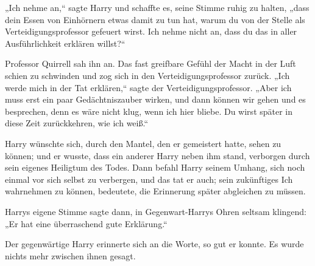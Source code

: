 „Ich nehme an,“ sagte Harry und schaffte es, seine Stimme ruhig zu halten, „dass dein Essen von Einhörnern etwas damit zu tun hat, warum du von der Stelle als Verteidigungsprofessor gefeuert wirst. Ich nehme nicht an, dass du das in aller Ausführlichkeit erklären willst?“

Professor Quirrell sah ihn an. Das fast greifbare Gefühl der Macht in der Luft schien zu schwinden und zog sich in den Verteidigungsprofessor zurück.
„Ich werde mich in der Tat erklären,“ sagte der Verteidigungsprofessor. „Aber ich muss erst ein paar Gedächtniszauber wirken, und dann können wir gehen und es besprechen, denn es wäre nicht klug, wenn ich hier bliebe. Du wirst später in diese Zeit zurückkehren, wie ich weiß.“

Harry wünschte sich, durch den Mantel, den er gemeistert hatte, sehen zu können; und er wusste, dass ein anderer Harry neben ihm stand, verborgen durch sein eigenes Heiligtum des Todes. Dann befahl Harry seinem Umhang, sich noch einmal vor sich selbst zu verbergen, und das tat er auch; sein zukünftiges Ich wahrnehmen zu können, bedeutete, die Erinnerung später abgleichen zu müssen.

Harrys eigene Stimme sagte dann, in Gegenwart-Harrys Ohren seltsam klingend: „Er hat eine überraschend gute Erklärung.“

Der gegenwärtige Harry erinnerte sich an die Worte, so gut er konnte. Es wurde nichts mehr zwischen ihnen gesagt.


